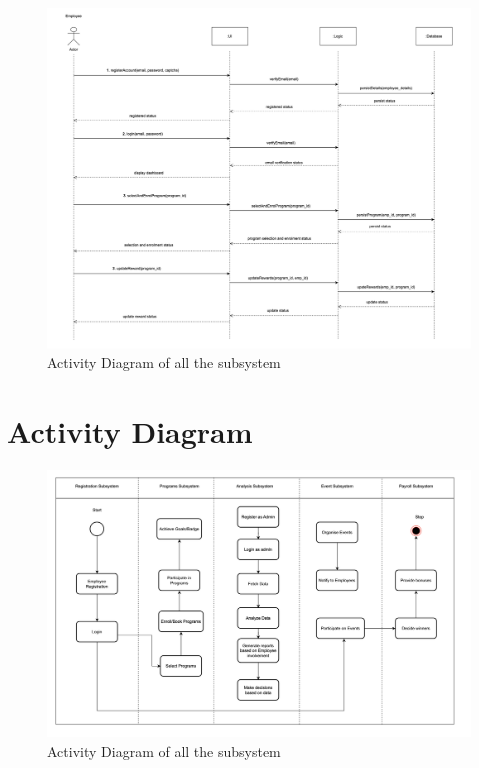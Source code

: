 \begin{figure}[h!t]
    \centering
    \includegraphics[width=\textwidth]{images/sequenceDiagram.png}
    \caption{Activity Diagram of all the subsystem}
    \label{fig:sequenceDiagram}
\end{figure}

\FloatBarrier

\section{Activity Diagram}

\begin{figure}[h!t]
    \centering
    \includegraphics[width=\textwidth]{images/activityDiagram.png}
    \caption{Activity Diagram of all the subsystem}
    \label{fig:activityDiagram}
\end{figure}

